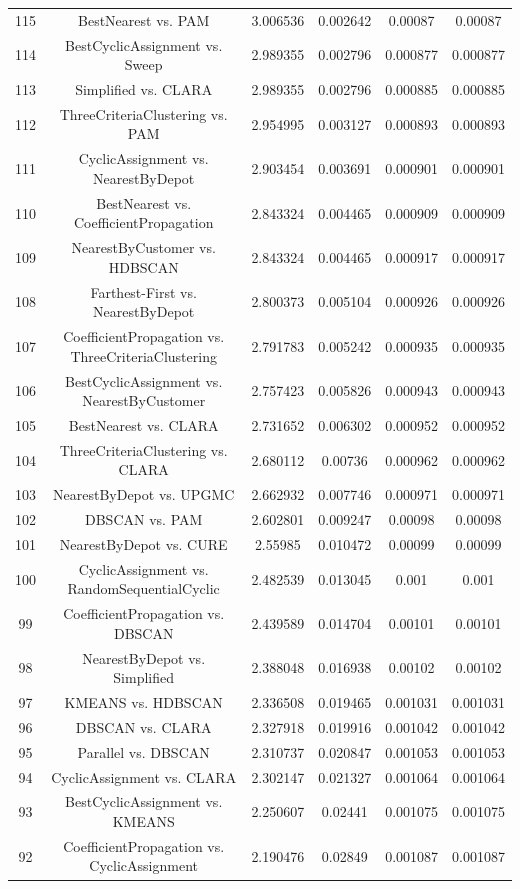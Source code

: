 \documentclass[a4paper,10pt]{article}
\begin{document}
\begin{landscape}
\begin{table}[!htp]
\begin{tabular}{cccccc}
115&BestNearest vs. PAM&3.006536&0.002642&0.00087&0.00087\\
114&BestCyclicAssignment vs. Sweep&2.989355&0.002796&0.000877&0.000877\\
113&Simplified vs. CLARA&2.989355&0.002796&0.000885&0.000885\\
112&ThreeCriteriaClustering vs. PAM&2.954995&0.003127&0.000893&0.000893\\
111&CyclicAssignment vs. NearestByDepot&2.903454&0.003691&0.000901&0.000901\\
110&BestNearest vs. CoefficientPropagation&2.843324&0.004465&0.000909&0.000909\\
109&NearestByCustomer vs. HDBSCAN&2.843324&0.004465&0.000917&0.000917\\
108&Farthest-First vs. NearestByDepot&2.800373&0.005104&0.000926&0.000926\\
107&CoefficientPropagation vs. ThreeCriteriaClustering&2.791783&0.005242&0.000935&0.000935\\
106&BestCyclicAssignment vs. NearestByCustomer&2.757423&0.005826&0.000943&0.000943\\
105&BestNearest vs. CLARA&2.731652&0.006302&0.000952&0.000952\\
104&ThreeCriteriaClustering vs. CLARA&2.680112&0.00736&0.000962&0.000962\\
103&NearestByDepot vs. UPGMC&2.662932&0.007746&0.000971&0.000971\\
102&DBSCAN vs. PAM&2.602801&0.009247&0.00098&0.00098\\
101&NearestByDepot vs. CURE&2.55985&0.010472&0.00099&0.00099\\
100&CyclicAssignment vs. RandomSequentialCyclic&2.482539&0.013045&0.001&0.001\\
99&CoefficientPropagation vs. DBSCAN&2.439589&0.014704&0.00101&0.00101\\
98&NearestByDepot vs. Simplified&2.388048&0.016938&0.00102&0.00102\\
97&KMEANS vs. HDBSCAN&2.336508&0.019465&0.001031&0.001031\\
96&DBSCAN vs. CLARA&2.327918&0.019916&0.001042&0.001042\\
95&Parallel vs. DBSCAN&2.310737&0.020847&0.001053&0.001053\\
94&CyclicAssignment vs. CLARA&2.302147&0.021327&0.001064&0.001064\\
93&BestCyclicAssignment vs. KMEANS&2.250607&0.02441&0.001075&0.001075\\
92&CoefficientPropagation vs. CyclicAssignment&2.190476&0.02849&0.001087&0.001087\\

\end{tabular}
\end{table}
\end{landscape}
\end{document}
